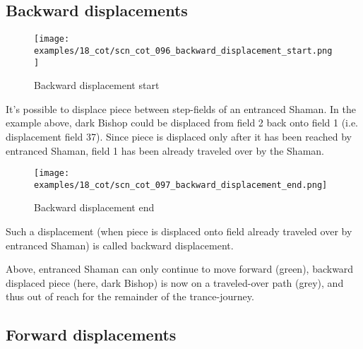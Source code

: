 \subsection*{Backward displacements}
\label{sec:Conquest of Tlalocan/Trance-journey/Backward displacements}

\noindent
\begin{figure}[!h]
\vspace{-1.0\baselineskip}
\texttt{[image: examples/18\_cot/scn\_cot\_096\_backward\_displacement\_start.png]}
\caption{Backward displacement start}
\label{fig:scn_cot_096_backward_displacement_start}
\end{figure}

It's possible to displace piece between step-fields of an entranced Shaman. In the
example above, dark Bishop could be displaced from field 2 back onto field 1 (i.e.
displacement field 37). Since piece is displaced only after it has been reached by
entranced Shaman, field 1 has been already traveled over by the Shaman.

\clearpage %

\noindent
\begin{figure}[!h]
\texttt{[image: examples/18\_cot/scn\_cot\_097\_backward\_displacement\_end.png]}
\caption{Backward displacement end}
\label{fig:scn_cot_097_backward_displacement_end}
\end{figure}

Such a displacement (when piece is displaced onto field already traveled over
by entranced Shaman) is called backward displacement.

Above, entranced Shaman can only continue to move forward (green), backward
displaced piece (here, dark Bishop) is now on a traveled-over path (grey),
and thus out of reach for the remainder of the trance-journey.

\clearpage %

\subsection*{Forward displacements}
\label{sec:Conquest of Tlalocan/Trance-journey/Forward displacements}

